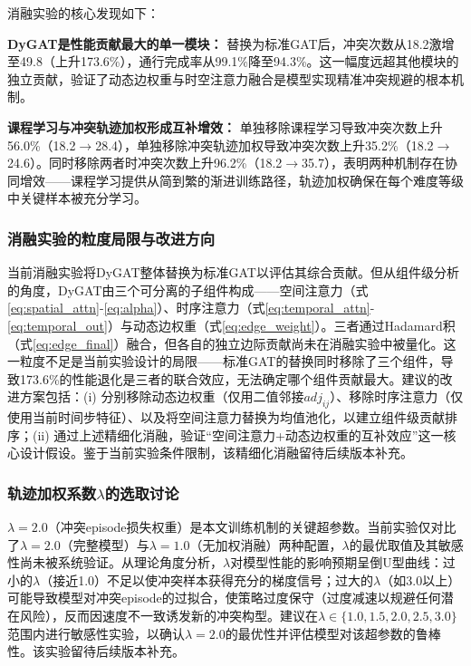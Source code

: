 \documentclass[12pt,a4paper,UTF8]{ctexart}
\begin{document}
消融实验的核心发现如下：

\textbf{DyGAT是性能贡献最大的单一模块：} 替换为标准GAT后，冲突次数从18.2激增至49.8（上升173.6\%），通行完成率从99.1\%降至94.3\%。这一幅度远超其他模块的独立贡献，验证了动态边权重与时空注意力融合是模型实现精准冲突规避的根本机制。

\textbf{课程学习与冲突轨迹加权形成互补增效：} 单独移除课程学习导致冲突次数上升56.0\%（18.2$\to$28.4），单独移除冲突轨迹加权导致冲突次数上升35.2\%（18.2$\to$24.6）。同时移除两者时冲突次数上升96.2\%（18.2$\to$35.7），表明两种机制存在协同增效——课程学习提供从简到繁的渐进训练路径，轨迹加权确保在每个难度等级中关键样本被充分学习。

\subsubsection{消融实验的粒度局限与改进方向}

当前消融实验将DyGAT整体替换为标准GAT以评估其综合贡献。但从组件级分析的角度，DyGAT由三个可分离的子组件构成——空间注意力（式\ref{eq:spatial_attn}-\ref{eq:alpha}）、时序注意力（式\ref{eq:temporal_attn}-\ref{eq:temporal_out}）与动态边权重（式\ref{eq:edge_weight}）。三者通过Hadamard积（式\ref{eq:edge_final}）融合，但各自的独立边际贡献尚未在消融实验中被量化。这一粒度不足是当前实验设计的局限——标准GAT的替换同时移除了三个组件，导致173.6\%的性能退化是三者的联合效应，无法确定哪个组件贡献最大。建议的改进方案包括：(i) 分别移除动态边权重（仅用二值邻接$adj_{ij}$）、移除时序注意力（仅使用当前时间步特征）、以及将空间注意力替换为均值池化，以建立组件级贡献排序；(ii) 通过上述精细化消融，验证``空间注意力+动态边权重的互补效应''这一核心设计假设。鉴于当前实验条件限制，该精细化消融留待后续版本补充。

\subsubsection{轨迹加权系数$\lambda$的选取讨论}

$\lambda=2.0$（冲突episode损失权重）是本文训练机制的关键超参数。当前实验仅对比了$\lambda=2.0$（完整模型）与$\lambda=1.0$（无加权消融）两种配置，$\lambda$的最优取值及其敏感性尚未被系统验证。从理论角度分析，$\lambda$对模型性能的影响预期呈倒U型曲线：过小的$\lambda$（接近1.0）不足以使冲突样本获得充分的梯度信号；过大的$\lambda$（如3.0以上）可能导致模型对冲突episode的过拟合，使策略过度保守（过度减速以规避任何潜在风险），反而因速度不一致诱发新的冲突构型。建议在$\lambda \in \{1.0, 1.5, 2.0, 2.5, 3.0\}$范围内进行敏感性实验，以确认$\lambda=2.0$的最优性并评估模型对该超参数的鲁棒性。该实验留待后续版本补充。
\end{document}
